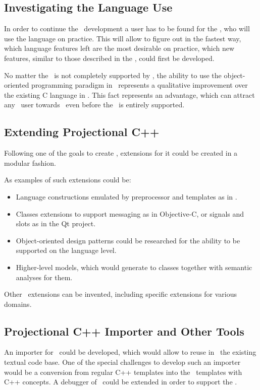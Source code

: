 \subsection{Investigating the Language Use}

In order to continue the \pcpp\ development a user has to be found for the \pcpp, who
will use the language on practice. This will allow to figure out in the fastest way,
which language features left are the most desirable on practice, which new features,
similar to those described in the , could first be developed.

No matter the \cpppl\ is not completely supported by \pcpp, the ability to use the
object-oriented programming paradigm in \mbdr\ represents a qualitative improvement over
the existing C language in \mbdr. This fact represents an advantage, which can
attract any \mbdr\ user towards  \pcpp\ even before the \cpppl\ is entirely supported.

\subsection{Extending Projectional C++}

Following one of the goals to create \pcpp, extensions for it could be created in a 
modular fashion.

As examples of such extensions could be:
\begin{itemize}
 \item Language constructions emulated by preprocessor and templates as in \cite{alexandrescu}.
 \item Classes extensions to support messaging as in Objective-C, or signals and slots as in the Qt project.
 \item Object-oriented design patterns could be researched for the ability to be supported on the 
 language level.
 \item Higher-level models, which would generate to classes together with semantic analyses for them.
\end{itemize}

Other \pcpp\ extensions can be invented, including specific extensions for various domains.


\subsection{Projectional C++ Importer and Other Tools}
An importer for  \pcpp\ could be developed, which would allow to reuse in  \pcpp\ the
existing textual code base. One of the special challenges to develop such an importer would 
be a conversion from regular C++ templates into the \pcpp\ templates with C++ concepts.
A debugger of \mbdr\ could be extended in order to support the \pcpp.


